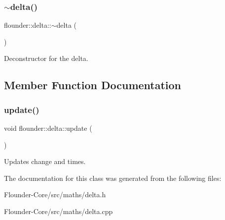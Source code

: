 \mbox{\label{classflounder_1_1delta_af9eb174b15b3730a45a903e988dac1e8}} 
\subsubsection{\texorpdfstring{$\sim$delta()}{~delta()}}
{\footnotesize\ttfamily flounder\+::delta\+::$\sim$delta (\begin{DoxyParamCaption}{ }\end{DoxyParamCaption})}



Deconstructor for the delta. 



\subsection{Member Function Documentation}
\mbox{\label{classflounder_1_1delta_a6f87fd0b76d229ec490a07a565c2afd0}} 
\subsubsection{\texorpdfstring{update()}{update()}}
{\footnotesize\ttfamily void flounder\+::delta\+::update (\begin{DoxyParamCaption}{ }\end{DoxyParamCaption})}



Updates change and times. 



The documentation for this class was generated from the following files\+:\begin{DoxyCompactItemize}
\item 
Flounder-\/\+Core/src/maths/delta.\+h\item 
Flounder-\/\+Core/src/maths/delta.\+cpp\end{DoxyCompactItemize}
